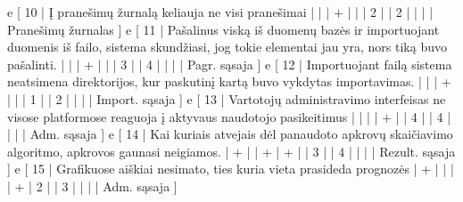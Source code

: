 {  e [ 10  | Į pranešimų žurnalą keliauja ne visi pranešimai     
                    |   |   | + |   |   | 2 |   | 2 |   |   |      | Pranešimų žurnalas ]
  e [ 11  | Pašalinus viską iš duomenų bazės ir importuojant duomenis iš failo,
  sistema skundžiasi, jog tokie elementai jau yra, nors tiką buvo pašalinti.     
                    |   |   | + |   |   | 3 |   | 4 |   |   |      | Pagr. sąsaja ]
  e [ 12  | Importuojant failą sistema neatsimena direktorijos, kur paskutinį
  kartą buvo vykdytas importavimas.   
                    |   |   | + |   |   | 1 |   | 2 |   |   |      | Import. sąsaja ]
  e [ 13  | Vartotojų administravimo interfeisas ne visose platformose reaguoja į
  aktyvaus naudotojo pasikeitimus  
                    |   |   |   | + |   | 4 |   | 4 |   |   |      | Adm. sąsaja ]
  e [ 14  | Kai kuriais atvejais dėl panaudoto apkrovų skaičiavimo algoritmo,
  apkrovos gaunasi neigiamos.
                    | + |   | + | + |   | 3 |   | 4 |   |   |      | Rezult. sąsaja ]
  e [ 15 | Grafikuose aiškiai nesimato, ties kuria vieta prasideda prognozės
                    | + |   |   |   | + | 2 |   | 3 |   |   |      | Adm. sąsaja ]
}
